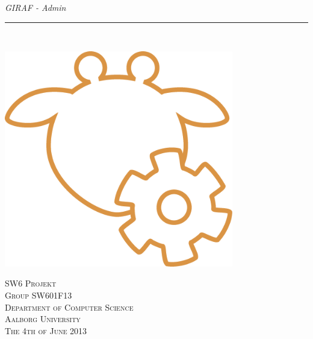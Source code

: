 
\thispagestyle{empty}
\begin{flushright}
\vspace{3cm}

\phantom{hul}

\phantom{hul}

\phantom{hul}

\textsl{\Huge GIRAF - Admin} \\ \vspace{1cm}

\rule{13cm}{3mm} \\ \vspace{1.5cm}
\vspace{1cm}

\includegraphics[width=0.75\textwidth]{images/girafAdminLogo.png}

\vspace{1.5cm} 
\textsc{\Large SW6 Projekt \\
Group SW601F13 \\
Department of Computer Science\\
Aalborg University\\
The 4th of June 2013\\}
\end{flushright}
